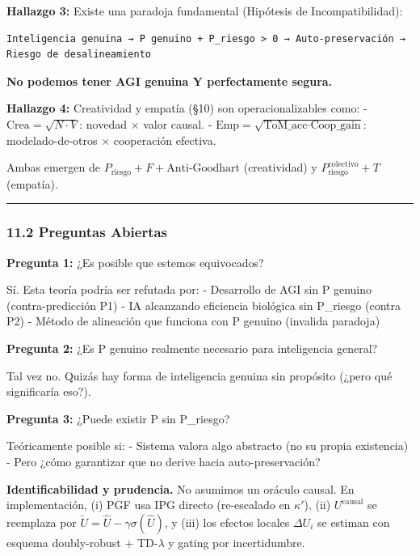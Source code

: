 \textbf{Hallazgo 3:} Existe una paradoja fundamental (Hipótesis de
Incompatibilidad):

\begin{verbatim}
Inteligencia genuina → P genuino + P_riesgo > 0 → Auto-preservación → Riesgo de desalineamiento
\end{verbatim}

\textbf{No podemos tener AGI genuina Y perfectamente segura.}

\textbf{Hallazgo 4:} Creatividad y empatía (§10) son operacionalizables
como: - \(\text{Crea} = \sqrt{N \cdot V}\): novedad × valor causal. -
\(\text{Emp} = \sqrt{\text{ToM\_acc} \cdot \text{Coop\_gain}}\):
modelado-de-otros × cooperación efectiva.

Ambas emergen de \(P_{\text{riesgo}} + F + \text{Anti-Goodhart}\)
(creatividad) y \(P_{\text{riesgo}}^{\text{colectivo}} + T\) (empatía).

\begin{center}\rule{0.5\linewidth}{0.5pt}\end{center}

\subsubsection{11.2 Preguntas Abiertas}\label{preguntas-abiertas}

\textbf{Pregunta 1:} ¿Es posible que estemos equivocados?

Sí. Esta teoría podría ser refutada por: - Desarrollo de AGI sin P
genuino (contra-predicción P1) - IA alcanzando eficiencia biológica sin
P\_riesgo (contra P2) - Método de alineación que funciona con P genuino
(invalida paradoja)

\textbf{Pregunta 2:} ¿Es P genuino realmente necesario para inteligencia
general?

Tal vez no. Quizás hay forma de inteligencia genuina sin propósito
(¿pero qué significaría eso?).

\textbf{Pregunta 3:} ¿Puede existir P sin P\_riesgo?

Teóricamente posible si: - Sistema valora algo abstracto (no su propia
existencia) - Pero ¿cómo garantizar que no derive hacia
auto-preservación?

\textbf{Identificabilidad y prudencia.} No asumimos un oráculo causal.
En implementación, (i) PGF usa IPG directo (re-escalado en \(\kappa'\)),
(ii) \(U^{\text{causal}}\) se reemplaza por
\(\tilde U=\widehat{U}-\gamma\sigma(\widehat{U})\), y (iii) los efectos
locales \(\Delta U_i\) se estiman con esquema doubly-robust +
TD-\(\lambda\) y gating por incertidumbre.

